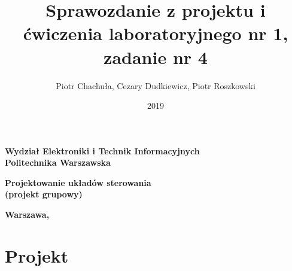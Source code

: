 \documentclass{mwrep}
\begin{document}
\frenchspacing
\pagestyle{uheadings}

\title{\bf Sprawozdanie z projektu i ćwiczenia laboratoryjnego nr 1, zadanie nr 4\vskip 0.1cm}
\author{Piotr Chachuła, Cezary Dudkiewicz, Piotr Roszkowski}
\date{2019}

\makeatletter
\renewcommand{\maketitle}{\begin{titlepage}
\begin{center}{\LARGE {\bf
Wydział Elektroniki i Technik Informacyjnych}}\\
\vspace{0.4cm}
{\LARGE {\bf Politechnika Warszawska}}\\
\vspace{0.3cm}
\end{center}
\vspace{5cm}
\begin{center}
{\bf \LARGE Projektowanie układów sterowania\\ (projekt grupowy) \vskip 0.1cm}
\end{center}
\vspace{1cm}
\begin{center}
{\bf \LARGE \@title}
\end{center}
\vspace{2cm}
\begin{center}
{\bf \Large \@author \par}
\end{center}
\vspace*{\stretch{6}}
\begin{center}
\bf{\large{Warszawa, \@date\vskip 0.1cm}}
\end{center}
\end{titlepage}
}
\makeatother

\maketitle

\tableofcontents
\part{Projekt}
\label{PROJEKT}



\appendix
\end{document}
